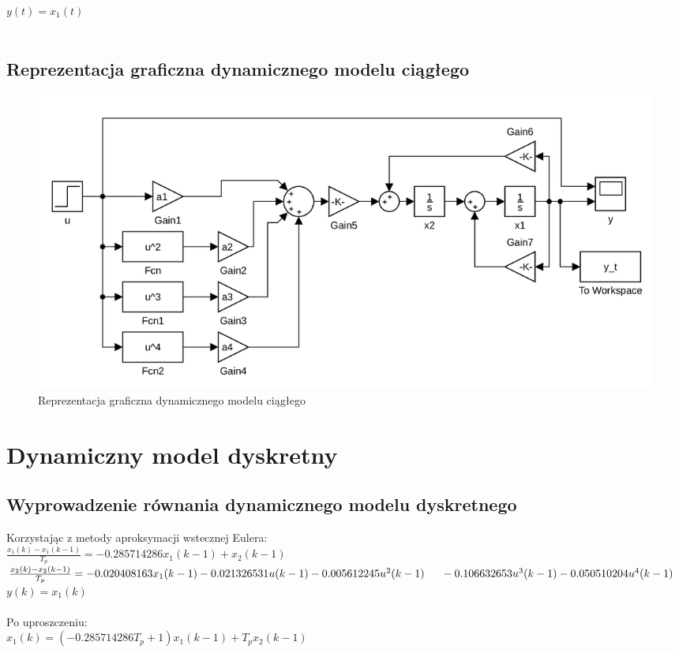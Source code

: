 \documentclass[a4paper, 11pt]{article}
\begin{document}
$y(t) = x_{1}(t)$
\\
\\
\subsection{Reprezentacja graficzna dynamicznego modelu ciągłego}
\begin{figure}[ht]
\centering
\includegraphics[scale=0.28]{dynamiczny_model_ciagly.png}
\caption{Reprezentacja graficzna dynamicznego modelu ciągłego }
\end{figure}


\section{Dynamiczny model dyskretny}

\subsection{Wyprowadzenie równania dynamicznego modelu dyskretnego}

Korzystając z metody aproksymacji wstecznej Eulera: 
\\

$\frac{x_1(k)- x_1(k-1)}{T_p} = -0.285714286x_1(k-1) +x_2(k-1)$
\\

$\frac{x_2(k)- x_2(k-1)}{T_p} = - 0.020408163x_1(k-1) - 0.021326531u(k-1) - 0.005612245u^2(k-1)\\
	\indent	- 0.106632653u^3(k-1) - 0.050510204u^4(k-1)$
\\

$y(k) = x_1(k)$
\\
\\
Po uproszczeniu: 
\\

$x_1(k) =(-0.285714286T_p+1)x_1(k-1)+T_px_2(k-1) $
\\
\end{document}
